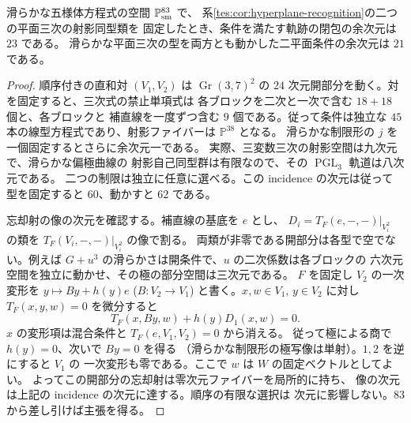 \begin{proposition}[二平面条件の余次元]\label{tes:prop:incidence-dimension}
滑らかな五様体方程式の空間 $\mathbb P^{83}_{\rm sm}$ で、
系\ref{tes:cor:hyperplane-recognition}の二つの平面三次の射影同型類を
固定したとき、条件を満たす軌跡の閉包の余次元は $23$ である。
滑らかな平面三次の型を両方とも動かした二平面条件の余次元は $21$ である。
\end{proposition}
\begin{proof}
順序付きの直和対 $(V_1,V_2)$ は $\operatorname{Gr}(3,7)^2$ の
$24$ 次元開部分を動く。対を固定すると、三次式の禁止単項式は
各ブロックを二次と一次で含む $18+18$ 個と、各ブロックと
補直線を一度ずつ含む $9$ 個である。従って条件は独立な
$45$ 本の線型方程式であり、射影ファイバーは $\mathbb P^{38}$ となる。
滑らかな制限形の $j$ を一個固定するとさらに余次元一である。
実際、三変数三次の射影空間は九次元で、滑らかな偏極曲線の
射影自己同型群は有限なので、その $\operatorname{PGL}_3$ 軌道は八次元である。
二つの制限は独立に任意に選べる。この incidence の次元は従って
型を固定すると $60$、動かすと $62$ である。

忘却射の像の次元を確認する。補直線の基底を $e$ とし、
$D_i=T_F(e,-,-)|_{V_i^2}$ の類を $T_F(V_i,-,-)|_{V_i^2}$ の像で割る。
両類が非零である開部分は各型で空でない。例えば
$G+u^3$ の滑らかさは開条件で、$u$ の二次係数は各ブロックの
六次元空間を独立に動かせ、その極の部分空間は三次元である。
$F$ を固定し $V_2$ の一次変形を $y\mapsto By+h(y)e$
($B:V_2\to V_1$) と書く。$x,w\in V_1$, $y\in V_2$ に対し
$T_F(x,y,w)=0$ を微分すると
\[
 T_F(x,By,w)+h(y)D_1(x,w)=0.
\]
$x$ の変形項は混合条件と $T_F(e,V_1,V_2)=0$ から消える。
従って極による商で $h(y)=0$、次いで $By=0$ を得る
（滑らかな制限形の極写像は単射）。$1,2$ を逆にすると $V_1$ の
一次変形も零である。ここで $w$ は $W$ の固定ベクトルとしてよい。
よってこの開部分の忘却射は零次元ファイバーを局所的に持ち、
像の次元は上記の incidence の次元に達する。順序の有限な選択は
次元に影響しない。$83$ から差し引けば主張を得る。
\end{proof}

